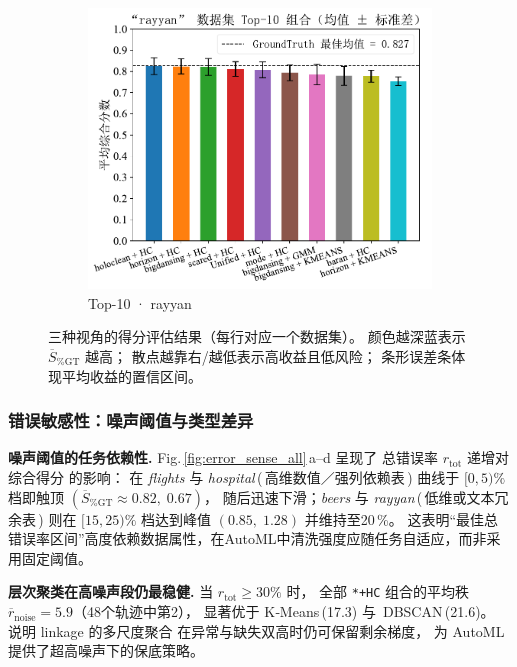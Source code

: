 \documentclass[10pt]{article} %
\numberwithin{equation}{section}
\begin{document}
\begin{figure}[htbp]
\begin{subfigure}{0.34\linewidth}
    \centering
    \includegraphics[width=\linewidth]{figures/5.3.1graph/top10_bar_error_rayyan.pdf}
    \caption{Top-10 · rayyan}
  \end{subfigure}

  \caption{三种视角的得分评估结果（每行对应一个数据集）。%
           颜色越深蓝表示 \(\overline{S}_{\%\mathrm{GT}}\) 越高；%
           散点越靠右/越低表示高收益且低风险；%
           条形误差条体现平均收益的置信区间。
           }
  \label{fig:score_eval_all}
\end{figure}

\subsubsection{错误敏感性：噪声阈值与类型差异}
\label{subsec:error_sensitivity}

\vspace{0.2em}
\noindent%
\textbf{噪声阈值的任务依赖性.}\;
Fig.\,\ref{fig:error_sense_all}\,a–d 呈现了
总错误率 \(r_{\text{tot}}\) 递增对综合得分
的影响：%
在 \textit{flights} 与 \textit{hospital}\,(\,高维数值／强列依赖表\,)
曲线于 \(\![0,5)\%\) 档即触顶
\((\overline{S}_{\%\mathrm{GT}}\approx 0.82,\;0.67)\)，
随后迅速下滑；\textit{beers} 与 \textit{rayyan}\,(\,低维或文本冗余表\,)
则在 \(\![15,25)\%\) 档达到峰值
\((0.85,\;1.28)\) 并维持至20 \%。
这表明“最佳总错误率区间”高度依赖数据属性，在AutoML中清洗强度应随任务自适应，而非采用固定阈值。

\medskip
\noindent%
\textbf{层次聚类在高噪声段仍最稳健.}\;
当 \(r_{\text{tot}}\ge 30\%\) 时，
全部 \texttt{*+HC} 组合的平均秩
\(\overline{r}_{\text{noise}}=5.9\)（48个轨迹中第2），
显著优于 K‑Means\,(17.3) 与 DBSCAN\,(21.6)。
说明 linkage 的多尺度聚合
在异常与缺失双高时仍可保留剩余梯度，
为 AutoML 提供了超高噪声下的保底策略。
\end{document}

